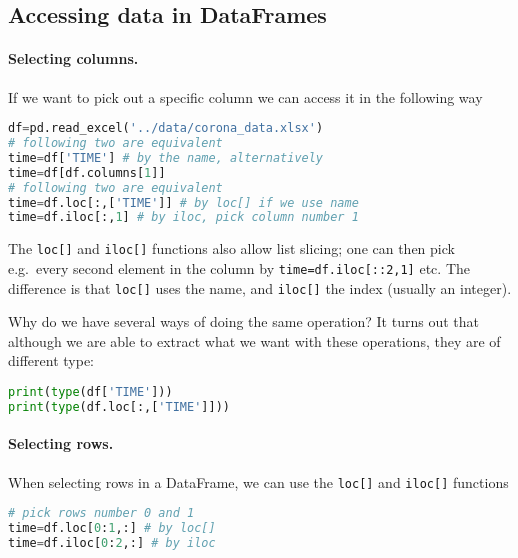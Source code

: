 \documentclass[graybox,sectrefs,envcountresetchap,open=right,final]{svmonodo}
\begin{document}
\subsection{Accessing data in  DataFrames}

\paragraph{Selecting columns.}
If we want to pick out a specific column we can access it in the following way








\begin{lstlisting}[language=python,style=blue1bar]
df=pd.read_excel('../data/corona_data.xlsx') 
# following two are equivalent
time=df['TIME'] # by the name, alternatively
time=df[df.columns[1]]
# following two are equivalent
time=df.loc[:,['TIME']] # by loc[] if we use name
time=df.iloc[:,1] # by iloc, pick column number 1

\end{lstlisting}

The \texttt{loc[]} and \texttt{iloc[]} functions also allow list slicing; one can then pick e.g.~every second element in the column by \texttt{time=df.iloc[::2,1]} etc. The difference is that \texttt{loc[]} uses the name, and \texttt{iloc[]} the index (usually an integer). 

Why do we have several ways of doing the same operation? It turns out that although we are able to extract what we want with these operations, they are of different type:



\begin{lstlisting}[language=python,style=blue1bar]
print(type(df['TIME']))
print(type(df.loc[:,['TIME']]))

\end{lstlisting}

\paragraph{Selecting rows.}
When selecting rows in a DataFrame, we can use the \texttt{loc[]} and \texttt{iloc[]} functions




\begin{lstlisting}[language=python,style=blue1bar]
# pick rows number 0 and 1
time=df.loc[0:1,:] # by loc[] 
time=df.iloc[0:2,:] # by iloc

\end{lstlisting}
\end{document}
